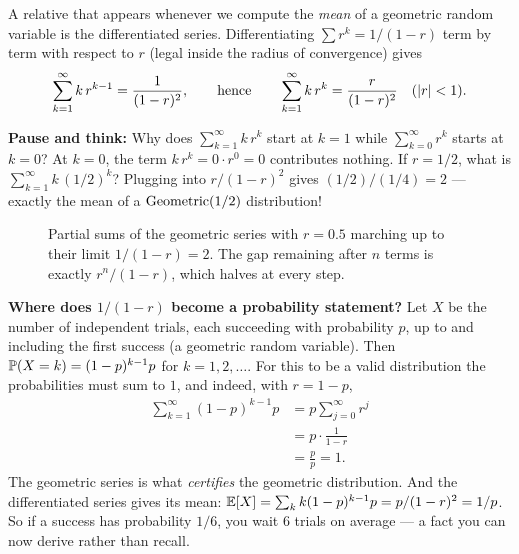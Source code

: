 A relative that appears whenever we compute the \emph{mean} of a geometric
random variable is the differentiated series. Differentiating $\sum r^k =
1/(1-r)$ term by term with respect to $r$ (legal inside the radius of
convergence) gives
\[
  \sum_{k=1}^{\infty} k\, r^{k-1} = \frac{1}{(1-r)^2}, \qquad\text{hence}\qquad
  \sum_{k=1}^{\infty} k\, r^{k} = \frac{r}{(1-r)^2} \quad (\abs{r}<1).
\]

\begin{recoverybox}
\textbf{Pause and think:} Why does $\sum_{k=1}^\infty k\,r^k$ start at $k=1$ while $\sum_{k=0}^\infty r^k$ starts at $k=0$? At $k=0$, the term $k\,r^k = 0\cdot r^0 = 0$ contributes nothing. If $r = 1/2$, what is $\sum_{k=1}^\infty k\,(1/2)^k$? Plugging into $r/(1-r)^2$ gives $(1/2)/(1/4) = 2$ --- exactly the mean of a $\Geom(1/2)$ distribution!
\end{recoverybox}

\begin{figure}[H]
\centering
{}
\caption{Partial sums of the geometric series with $r = 0.5$ marching up to
their limit $1/(1-r) = 2$. The gap remaining after $n$ terms is exactly
$r^n/(1-r)$, which halves at every step.}
\label{ch39:geomfig}
\end{figure}

\begin{applicationbox}
\textbf{Where does $1/(1-r)$ become a probability statement?} Let $X$ be the
number of independent trials, each succeeding with probability $p$, up to and
including the first success (a geometric random variable). Then $\P(X = k) =
(1-p)^{k-1}p$ for $k = 1,2,\dots$. For this to be a valid distribution the
probabilities must sum to $1$, and indeed, with $r = 1-p$,
\begin{align*}
  \sum_{k=1}^{\infty}(1-p)^{k-1}p &= p\sum_{j=0}^{\infty} r^{j} \\
  &= p\cdot\frac{1}{1-r} \\
  &= \frac{p}{p} = 1.
\end{align*}
The geometric series is what \emph{certifies} the geometric distribution. And
the differentiated series gives its mean: $\E[X] = \sum_k k(1-p)^{k-1}p =
p/(1-r)^2 = 1/p$. So if a success has probability $1/6$, you wait $6$ trials on
average --- a fact you can now derive rather than recall.
\end{applicationbox}


